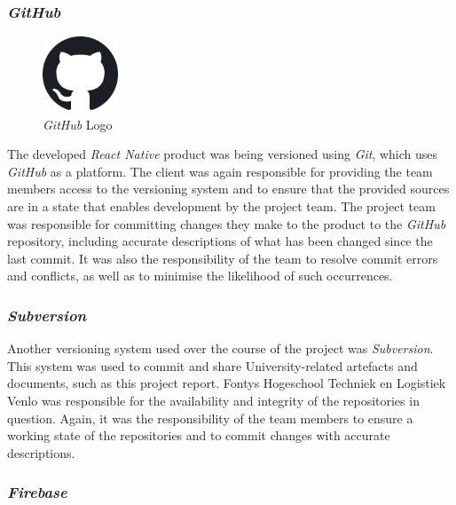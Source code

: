 \subsubsection{\textit{GitHub}}
\label{sssec:github}

\begin{figure}[H]
    \begin{center}
        \includegraphics[width=0.2\textwidth]{images/logos/github-logo.png}
        \caption{\textit{GitHub} Logo}
        \label{fig:github_logo}
    \end{center}
\end{figure}

The developed \textit{React Native} product was being versioned using \textit{Git}, which uses \textit{GitHub} as a platform. The client was again responsible for providing the team members access to the versioning system and to ensure that the provided sources are in a state that enables development by the project team.
\newline
The project team was responsible for committing changes they make to the product to the \textit{GitHub} repository, including accurate descriptions of what has been changed since the last commit. It was also the responsibility of the team to resolve commit errors and conflicts, as well as to minimise the likelihood of such occurrences.

\subsubsection{\textit{Subversion}}
\label{sssec:subversion}

Another versioning system used over the course of the project was \textit{Subversion}. This system was used to commit and share University-related artefacts and documents, such as this project report.
\newline
Fontys Hogeschool Techniek en Logistiek Venlo was responsible for the availability and integrity of the repositories in question. Again, it was the responsibility of the team members to ensure a working state of the repositories and to commit changes with accurate descriptions.

\subsubsection{\textit{Firebase}}
\label{sssec:firebase}

